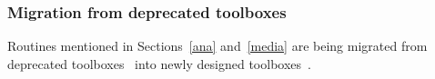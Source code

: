 																																																																																																																																																																																																																																																																																																																																																																																																																																																								\subsubsection{Migration from deprecated toolboxes}
																																																																																																																																																																																																																																																																																																																																																																																																																																																								Routines mentioned in Sections~\ref{ana} and~\ref{media} are being migrated from deprecated
																																																																																																																																																																																																																																																																																																																																																																																																																																																								toolboxes~\cite{gmaneLegacy,percolationLegacy} into newly designed
																																																																																																																																																																																																																																																																																																																																																																																																																																																								toolboxes~\cite{percolation,visuals}.

